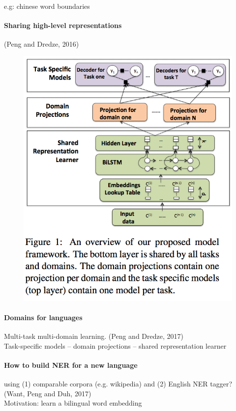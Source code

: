 e.g: chinese word boundaries

\paragraph{Sharing high-level representations} (Peng and Dredze, 2016)
\begin{figure}[h]
	\centering
	\includegraphics[scale=0.6]{fig0601/peng2016multi-task}
\end{figure}

\paragraph{Domains for languages}
Multi-task multi-domain learning. (Peng and Dredze, 2017) \\
Task-specific models  -- domain projections -- shared representation learner

\paragraph{How to build NER for a new language} using (1) comparable corpora (e.g. wikipedia) and (2) English NER tagger? (Want, Peng and Duh, 2017) \\
Motivation: learn a bilingual word embedding\\

